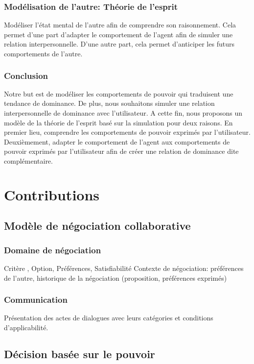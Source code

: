 \documentclass [french]{article}
\begin{document}
			\subsubsection{Modélisation de l'autre: Théorie de l'esprit} Modéliser l'état mental de l'autre afin de comprendre son raisonnement. Cela permet d'une part d'adapter le comportement de l'agent afin de simuler une relation interpersonnelle. D'une autre part, cela permet d'anticiper les futurs comportements de l'autre. 
		
		\subsubsection{Conclusion}
		
			Notre but est de modéliser les comportements de pouvoir qui traduisent une tendance de dominance. De plus, nous souhaitons simuler une relation interpersonnelle de dominance avec l'utilisateur. A cette fin, nous proposons un modèle de la théorie de l'esprit basé sur la simulation  pour deux raisons. En premier lieu, comprendre les comportements de pouvoir exprimés par l'utilisateur. Deuxièmement, adapter le comportement de l'agent aux comportements de pouvoir exprimés par l'utilisateur afin de créer une relation de dominance dite complémentaire. 	
			
	
	\section{Contributions}
		
		\subsection{Modèle de négociation collaborative}
			\subsubsection{Domaine de négociation }
				 Critère , Option, Préférences, Satisfiabilité
				Contexte de négociation: préférences de l'autre, historique de la négociation (proposition, préférences exprimés)
			
			\subsubsection{Communication}
			 Présentation des actes de dialogues avec leurs catégories et conditions d'applicabilité. 


		\subsection{Décision basée sur le pouvoir}
\end{document}
